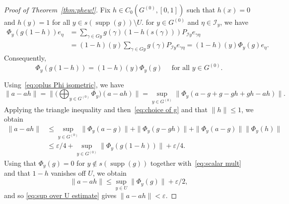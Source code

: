 \documentclass[a4paper, 12pt]{amsart}
\theoremstyle{plain}
\theoremstyle{definition}
\theoremstyle{remark}
\newcommand{\supp}{\operatorname{supp}}
\newcommand{\Ii}{\mathcal{I}}
\numberwithin{equation}{section}
\begin{document}
\begin{proof}[Proof of Theorem~\ref{thm:phew!}]
Fix $h \in C_0(G^{(0)}, [0,1])$ such that $h(x) = 0$ and $h(y) = 1$ for all
$y \in s(\supp(g)) \setminus U$. for $y \in G^{(0)}$ and $\eta \in \Ii_y$, we have
\begin{align*}
\Phi_y(g(1-h)) e_\eta
    &= \sum_{\gamma \in G y} g(\gamma)(1 - h(s(\gamma))) P_{\Ii y} e_{\gamma\eta}\\
    &= (1 - h)(y) \sum_{\gamma \in G y} g(\gamma) P_{\Ii y} e_{\gamma\eta}
    = (1 - h)(y) \Phi_y(g) e_\eta.
\end{align*}
Consequently,
\begin{equation} \label{eq:scalar mult}
    \Phi_y(g(1-h)) = (1-h)(y) \Phi_y(g)\quad\text{ for all $y \in G^{(0)}$.}
\end{equation}

Using~\eqref{eq:oplus Phi isometric}, we have
\[
\|a - ah\|
    = \Big\|\Big(\bigoplus_{y \in G^{(0)}} \Phi_y\Big)(a - ah)\Big\|
	= \sup_{y \in G^{(0)}} \|\Phi_y(a - g + g - gh + gh - ah)\|.
\]
Applying the triangle inequality and then~\eqref{eq:choice of g} and that $\|h\| \leq 1$, we obtain
\begin{align*}
\|a - ah\| &\le \sup_{y \in G^{(0)}} \|\Phi_y(a - g)\| + \|\Phi_y(g - gh)\| + \|\Phi_y(a - g)\| \|\Phi_y(h)\|\\
	&\le \varepsilon/4 + \sup_{y \in G^{(0)}} \|\Phi_y(g(1 - h))\| + \varepsilon/4.
\end{align*}
Using that $\Phi_y (g)=0$ for $y \notin s(\supp(g))$ together with~\eqref{eq:scalar mult} and that $1 - h$ vanishes off $U$, we obtain
\[
\|a - ah\| \le \sup_{y \in U} \|\Phi_y(g)\| + \varepsilon/2,
\]
and so \eqref{eq:sup over U estimate} gives $\|a - ah\| < \varepsilon$.
\end{proof}
\end{document}
